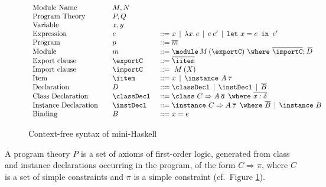 \begin{figure} 
\begin{mdframed}
\[ \begin{array}[c]{llll}
\textrm{Module Name}        &              & M,N            & \\
\textrm{Program Theory}     &         & P,Q            &\\
\textrm{Variable}           &         & x, y           &\\
\textrm{Expression}         &         & e              & ::= x \,\mid\, \lambda x.\,e  \,\mid\, e\:e' \,\mid\, \mlet x = e\,\iin\,e'\\ 
\textrm{Program}            &         & p              & ::= \overline{m}\\
\textrm{Module}             &         & m              & ::= \module\, M\, (\exportC) \ \where\ \overline{\importC};\: \overline{\!D}\\
\textrm{Export clause}      &         & \exportC\      & ::= \overline{\iitem}\\
\textrm{Import clause}      &         & \importC\      & ::= \ M\: (X)\\
\textrm{Item}               &         & \iitem         & ::= x \,\mid\, \instance\ A\: \overline{\tau} \\ 
\textrm{Declaration}        &         & D              & ::= \classDecl \,\mid\, \instDecl \,\mid\, \overline{B}\\
\textrm{Class Declaration}  &         & \classDecl\    & ::= \class\ C \Rightarrow A\: \overline{a}\:\: \where\ \overline{x:\delta}\\
\textrm{Instance Declaration} &       & \instDecl\     & ::= \instance\ C \Rightarrow A\: \overline{\tau}\:\: \where\ \overline{B} 
                                                             \,\mid\, \instance\ B\\
\textrm{Binding}              &       & B              & ::= x = e 
\end{array} \] 
\end{mdframed} \vspace{-.2cm}
\caption{Context-free syntax of mini-Haskell}
\label{fig:mini-Haskell-context-free-syntax}
\end{figure}

A program theory $P$ is a set of axioms of first-order logic,
generated from class and instance declarations occurring in the
program, of the form $C \Rightarrow \pi$, where $C$ is a set of simple
constraints and $\pi$ is a simple constraint (cf.~Figure
\ref{fig:mini-Haskell-context-free-syntax}).

